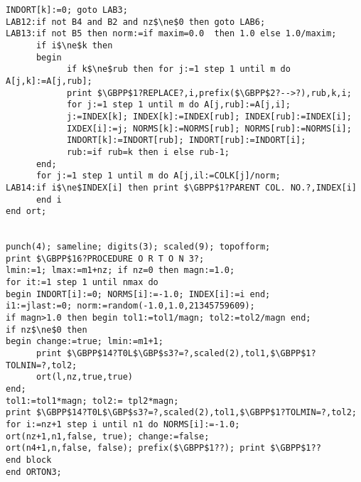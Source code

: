 \begin{lstlisting}[mathescape]
      INDORT[k]:=0; goto LAB3;
LAB12:if not B4 and B2 and nz$\ne$0 then goto LAB6;
LAB13:if not B5 then norm:=if maxim=0.0  then 1.0 else 1.0/maxim;
      if i$\ne$k then
      begin
            if k$\ne$rub then for j:=1 step 1 until m do A[j,k]:=A[j,rub];
            print $\GBPP$1?REPLACE?,i,prefix($\GBPP$2?-->?),rub,k,i;
            for j:=1 step 1 until m do A[j,rub]:=A[j,i];
            j:=INDEX[k]; INDEX[k]:=INDEX[rub]; INDEX[rub]:=INDEX[i];
            IXDEX[i]:=j; NORMS[k]:=NORMS[rub]; NORMS[rub]:=NORMS[i];
            INDORT[k]:=INDORT[rub]; INDORT[rub]:=INDORT[i];
            rub:=if rub=k then i else rub-1;
      end;
      for j:=1 step 1 until m do A[j,il:=COLK[j]/norm;
LAB14:if i$\ne$INDEX[i] then print $\GBPP$1?PARENT COL. NO.?,INDEX[i]
      end i
end ort;


punch(4); sameline; digits(3); scaled(9); topofform;
print $\GBPP$16?PROCEDURE O R T O N 3?;
lmin:=1; lmax:=m1+nz; if nz=0 then magn:=1.0;
for it:=1 step 1 until nmax do
begin INDORT[i]:=0; NORMS[i]:=-1.0; INDEX[i]:=i end;
i1:=jlast:=0; norm:=random(-1.0,1.0,21345759609);
if magn>1.0 then begin tol1:=tol1/magn; tol2:=tol2/magn end;
if nz$\ne$0 then
begin change:=true; lmin:=m1+1;
      print $\GBPP$14?T0L$\GBP$s3?=?,scaled(2),tol1,$\GBPP$1?TOLNIN=?,tol2;
      ort(l,nz,true,true)
end;
tol1:=tol1*magn; tol2:= tpl2*magn;
print $\GBPP$14?T0L$\GBP$s3?=?,scaled(2),tol1,$\GBPP$1?TOLMIN=?,tol2;
for i:=nz+1 step i until n1 do NORMS[i]:=-1.0;
ort(nz+1,n1,false, true); change:=false;
ort(n4+1,n,false, false); prefix($\GBPP$1??); print $\GBPP$1??
end block
end ORTON3;
\end{lstlisting}
